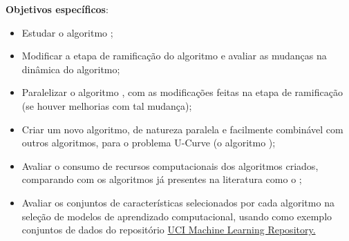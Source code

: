{\bf Objetivos específicos}:
\begin{itemize}
\item{Estudar o algoritmo ;}
\item{Modificar a etapa de ramificação do algoritmo  e 
    avaliar as mudanças na dinâmica do algoritmo;}
\item{Paralelizar o algoritmo , com as modificações feitas
    na etapa de ramificação (se houver melhorias com tal mudança);}
\item{Criar um novo algoritmo, de natureza paralela e facilmente 
    combinável com outros algoritmos, para o problema U-Curve (o 
    algoritmo );}
\item{Avaliar o consumo de recursos computacionais dos algoritmos 
    criados, comparando com os algoritmos já presentes na literatura 
    como o ;}
\item{Avaliar os conjuntos de características selecionados por cada 
    algoritmo na seleção de modelos de aprendizado computacional, usando 
    como exemplo conjuntos de dados do repositório 
    \href{https://archive.ics.uci.edu/ml/index.php}
        {UCI Machine Learning Repository.}}
\end{itemize}

